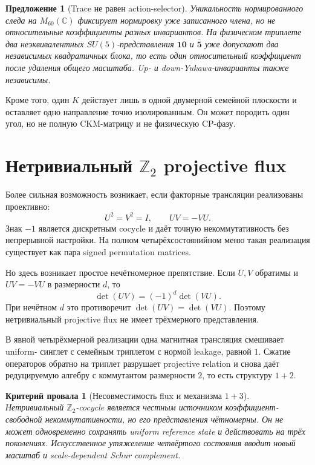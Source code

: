 \documentclass[12pt,a4paper]{article}
\newtheorem{proposition}{Предложение}
\newtheorem{nogocriterion}{Критерий провала}
\begin{document}
\begin{proposition}[Trace не равен action-selector]
Уникальность нормированного следа на $M_{60}(\mathbb C)$ фиксирует нормировку
уже записанного члена, но не относительные коэффициенты разных инвариантов.
На физическом триплете два неэквивалентных $SU(5)$-представления
$\mathbf{10}$ и $\overline{\mathbf5}$ уже допускают два независимых
квадратичных блока, то есть один относительный коэффициент после удаления
общего масштаба. Up- и down-Yukawa-инварианты также независимы.
\end{proposition}

Кроме того, один $K$ действует лишь в одной двумерной семейной плоскости и
оставляет одно направление точно изолированным. Он может породить один угол,
но не полную CKM-матрицу и не физическую CP-фазу.

\section{Нетривиальный $\mathbb Z_2$ projective flux}

Более сильная возможность возникает, если факторные трансляции реализованы
проективно:
\begin{equation}
 U^2=V^2=I,
 \qquad UV=-VU.
\end{equation}
Знак $-1$ является дискретным cocycle и даёт точную некоммутативность без
непрерывной настройки. На полном четырёхсостоянийном меню такая реализация
существует как пара signed permutation matrices.

Но здесь возникает простое нечётномерное препятствие. Если $U,V$ обратимы и
$UV=-VU$ в размерности $d$, то
\begin{equation}
 \det(UV)=(-1)^d\det(VU).
\end{equation}
При нечётном $d$ это противоречит $\det(UV)=\det(VU)$. Поэтому нетривиальный
projective flux не имеет трёхмерного представления.

В явной четырёхмерной реализации одна магнитная трансляция смешивает uniform-
синглет с семейным триплетом с нормой leakage, равной $1$. Сжатие операторов
обратно на триплет разрушает projective relation и снова даёт редуцируемую
алгебру с коммутантом размерности $2$, то есть структуру $1+2$.

\begin{nogocriterion}[Несовместимость flux и механизма $1+3$]
Нетривиальный $\mathbb Z_2$-cocycle является честным источником
коэффициент-свободной некоммутативности, но его представления чётномерны. Он
не может одновременно сохранять uniform reference state и действовать на
трёх поколениях. Искусственное утяжеление четвёртого состояния вводит новый
масштаб и scale-dependent Schur complement.
\end{nogocriterion}
\end{document}
